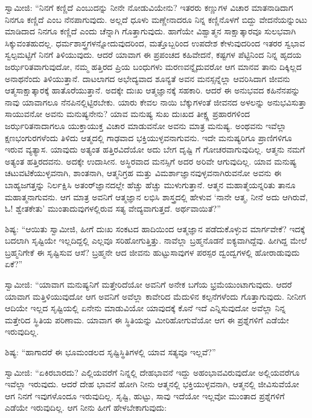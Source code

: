  ಸ್ವಾಮೀಜಿ: “ನಿನಗೆ ಕಣ್ಣಿದೆ ಎಂಬುದನ್ನು ನೀನೇ ನೋಡುವಿಯೇನು? ಇತರರು ಕಣ್ಣುಗಳ ವಿಚಾರ ಮಾತನಾಡಿದಾಗ ನಿನಗೂ ಕಣ್ಣಿದೆ ಎಂಬ ನೆನಪಾಗುವುದು. ಅಲ್ಲದೆ ಧೂಳು ಮಣ್ಣೇನಾದರೂ ನಿನ್ನ ಕಣ್ಣಿನೊಳಗೆ ಬಿದ್ದು ವೇದನೆಯನ್ನುಂಟು ಮಾಡಿದಾದ ನಿನಗೂ ಕಣ್ಣಿದೆ ಎಂದು ಚೆನ್ನಾಗಿ ಗೊತ್ತಾಗುವುದು. ಹಾಗೆಯೇ ವಿಶ್ವಾತ್ಮನ ಸಾಕ್ಷಾತ್ಕಾರವೂ ಸುಲಭವಾಗಿ ಸಿಕ್ಕುವಂತಹುದಲ್ಲ. ಧರ್ಮಶಾಸ್ತ್ರಗಳನ್ನೋದುವುದರಿಂದ, ಮತ್ತೊಬ್ಬರಿಂದ ಉಪದೇಶ ಕೇಳುವುದರಿಂದ ಇತರರ ಸ್ವಭಾವ ಸ್ವಲ್ಪಮಟ್ಟಿಗೆ ನಿನಗೆ ತಿಳಿಯುವುದು. ಆದರೆ ಯಾವಾಗ ಈ ಪ್ರಪಂಚದ ಕಹಿವೇದನೆ, ಕಷ್ಟಗಳ ಪೆಟ್ಟಿನಿಂದ ನಿನ್ನ ಹೃದಯ ಜರ್ಝರಿತವಾಗುವುದೋ, ನಮ್ಮ ಹತ್ತಿರದ ಪ್ರಿಯ ಬಂಧುಗಳು ಮರಣವನ್ನೈದುವರೋ ಆಗ ಮಾನವ ತಾನು ದಿಕ್ಕಿಲ್ಲದ ಅನಾಥನೆಂದು ತಿಳಿಯುತ್ತಾನೆ. ದಾಟಲಾಗದ ಅಭೇದ್ಯವಾದ ಶೂನ್ಯತೆ ಅವನ ಮನಸ್ಸನ್ನೆಲ್ಲಾ ಆವರಿಸಿದಾಗ ಜೀವನು ಆತ್ಮಸಾಕ್ಷಾತ್ಕಾರಕ್ಕೆ ಹಾತೊರೆಯುತ್ತಾನೆ. ಅದಕ್ಕೇ ದುಃಖ ಆತ್ಮಜ್ಞಾನಕ್ಕೆ ಸಹಕಾರಿ. ಆದರೆ ಈ ಅನುಭವದ ಕಹಿನೆನಪನ್ನು ನಾವು ಯಾವಾಗಲೂ ನೆನಪಿನಲ್ಲಿಟ್ಟಿರಬೇಕು. ಯಾರು ಕೇವಲ ನಾಯಿ ಬೆಕ್ಕುಗಳಂತೆ ಜೀವನದ ಅಳಲನ್ನು ಅನುಭವಿಸುತ್ತಾ ಸಾಯುವನೋ ಅವನು ಮನುಷ್ಯನೇನು? ಯಾವ ಮನುಷ್ಯ ಸುಖ ದುಃಖದ ತೀಕ್ಷ್ಣ ಪ್ರಹಾರಗಳಿಂದ ಜರ್ಝರಿತನಾದಾಗಲೂ ಯುಕ್ತಾಯುಕ್ತ ವಿಚಾರ ಮಾಡುವನೋ ಅವನು ಮಾತ್ರ ಮನುಷ್ಯ. ಅಂಥವನು ಇವೆಲ್ಲಾ ಕ್ಷಣಭಂಗುರಗಳೆಂದು ತಿಳಿದು ಆತ್ಮದಲ್ಲಿ ಗಾಢವಾದ ಭಕ್ತಿಯುಳ್ಳವನಾಗುವನು. ಇದೇ ಮನುಷ್ಯರಿಗೂ ಪ್ರಾಣಿಗಳಿಗೂ ಇರುವ ವ್ಯತ್ಯಾಸ. ಯಾವುದು ಅತ್ಯಂತ ಹತ್ತಿರವಿದೆಯೋ ಅದು ಬೇಗ ದೃಷ್ಟಿ ಗೆ ಗೋಚರವಾಗುವುದಿಲ್ಲ. ಆತ್ಮನು ನಮಗೆ ಅತ್ಯಂತ ಹತ್ತಿರದವನು. ಅದಕ್ಕೇ ಉದಾಸೀನ. ಅಸ್ಥಿರವಾದ ಮನಸ್ಸಿಗೆ ಅದರ ಅರಿವೇ ಆಗುವುದಿಲ್ಲ. ಯಾವ ಮನುಷ್ಯ ಚಟುವಟಿಕೆಯುಳ್ಳವನಾಗಿ, ಶಾಂತನಾಗಿ, ಆತ್ಮನಿಗ್ರಹ ಮತ್ತು ವಿಮರ್ಶಾಜ್ಞಾನವುಳ್ಳವನಾಗಿರುವನೋ ಅವನು ಈ ಬಾಹ್ಯಜಗತ್ತನ್ನು ನಿರ್ಲಕ್ಷಿಸಿ ಅತಂರ್‌ಜ್ಞಾನದಲ್ಲೇ ಹೆಚ್ಚು ಹೆಚ್ಚು ಮುಳುಗುತ್ತಾನೆ. ಆತ್ಮನ ಮಹಾತ್ಮೆಯನ್ನರಿತು ತಾನೂ ಮಹಾತ್ಮನಾಗುವನು. ಆಗ ಮಾತ್ರ ಅವನಿಗೆ ಆತ್ಮಜ್ಞಾನ ಲಭಿಸಿ ಶಾಸ್ತ್ರದಲ್ಲಿ ಹೇಳುವ ‘ನಾನೇ ಆತ್ಮ, ನೀನೆ ಅದು ಆಗಿರುವೆ, ಓ! ಶ್ವೇತಕೇತು’ ಮುಂತಾದುವುಗಳಲ್ಲಿರುವ ಸತ್ಯ ವೇದ್ಯವಾಗುತ್ತದೆ. ಅರ್ಥವಾಯಿತೆ?” 

 ಶಿಷ್ಯ: “ಆಯಿತು ಸ್ವಾಮೀಜಿ, ಹೀಗೆ ದುಃಖ ಸಂಕಟದ ಹಾದಿಯಿಂದ ಆತ್ಮಜ್ಞಾನ ಪಡೆದುಕೊಳ್ಳುವ ಮಾರ್ಗವೇಕೆ? ಇದಕ್ಕೆ ಬದಲಾಗಿ ಸೃಷ್ಟಿಯೇ ಇಲ್ಲದಿದ್ದಲ್ಲಿ ಎಲ್ಲವೂ ಸರಿಹೋಗುತ್ತಿತ್ತು. ನಾವೆಲ್ಲಾ ಬ್ರಹ್ಮನೊಡನೆ ಐಕ್ಯವಾಗಿದ್ದೆವು. ಹೀಗಿದ್ದ ಮೇಲೆ ಬ್ರಹ್ಮನಿಗೇಕೆ ಈ ಸೃಷ್ಟಿಸುವ ಆಸೆ? ಬ್ರಹ್ಮನೇ ಆದ ಜೀವನು ಹುಟ್ಟುಸಾವುಗಳ ಪರಸ್ಪರ ದ್ವಂದ್ವಗಳಲ್ಲಿ ಹೋರಾಡುವುದು ಏಕೆ?” 

 ಸ್ವಾಮೀಜಿ: “ಯಾವಾಗ ಮನುಷ್ಯನಿಗೆ ಮತ್ತೇರಿದೆಯೋ ಅವನಿಗೆ ಅನೇಕ ಬಗೆಯ ಭ್ರಮೆಯುಂಟಾಗುವುದು. ಆದರೆ ಯಾವಾಗ ಮತ್ತಿಳಿಯುವುದೋ ಆಗ ಅವನಿಗೆ ಅವೆಲ್ಲಾ ಕಾವೇರಿದ ಮೆದುಳಿನ ಕಲ್ಪನೆಗಳೆಂದು ಗೊತ್ತಾಗುವುದು. ನೀನೀಗ ಆದಿಯೇ ಇಲ್ಲದ ಸೃಷ್ಟಿಯಲ್ಲಿ ಏನೇನು ಮಾಡುವಿಯೋ ಯಾವುದಕ್ಕೆ ಕೊನೆ ಇದೆ ಎನ್ನಿಸುವುದೋ ಅವೆಲ್ಲಾ ನಿನ್ನ ಮತ್ತೇರಿದ ಸ್ಥಿತಿಯ ಪರಿಣಾಮ. ಯಾವಾಗ ಈ ಸ್ಥಿತಿಯನ್ನು ಮೀರಿಹೋಗುವೆಯೋ ಆಗ ಈ ಪ್ರಶ್ನೆಗಳಿಗೆ ಎಡೆಯೇ ಇರುವುದಿಲ್ಲ. 

 ಶಿಷ್ಯ: “ಹಾಗಾದರೆ ಈ ಭೂಮಂಡಲದ ಸೃಷ್ಟಿಸ್ಥಿತಿಗಳಲ್ಲಿ ಯಾವ ಸತ್ಯವೂ ಇಲ್ಲವೆ?” 

 ಸ್ವಾಮೀಜಿ: “ಏಕಿರಬಾರದು? ಎಲ್ಲಿಯವರೆಗೆ ನಿನ್ನಲ್ಲಿ ದೇಹಭಾವನೆ ಇದ್ದು ಅಹಂಭಾವವಿರುವುದೋ ಅಲ್ಲಿಯವರೆಗೂ ಇವೆಲ್ಲಾ ಇರುವುದು. ಆದರೆ ದೇಹ ಭಾವನೆ ಹೋಗಿ ನೀನು ಆತ್ಮನಲ್ಲಿ ಭಕ್ತಿಯುಳ್ಳವನಾಗಿ, ಆತ್ಮನಲ್ಲಿ ಜೀವಿಸುವೆಯೋ ಆಗ ನಿನಗೆ ಇವುಗಳೊಂದೂ ಇರುವುದಿಲ್ಲ. ಸೃಷ್ಟಿ, ಹುಟ್ಟು, ಸಾವು ಇದೆಯೋ ಇಲ್ಲವೋ ಮುಂತಾದ ಪ್ರಶ್ನೆಗಳಿಗೆ ಎಡೆಯೇ ಇರುವುದಿಲ್ಲ. ಆಗ ನೀನು ಹೀಗೆ ಹೇಳಬೇಕಾಗುವುದು:

